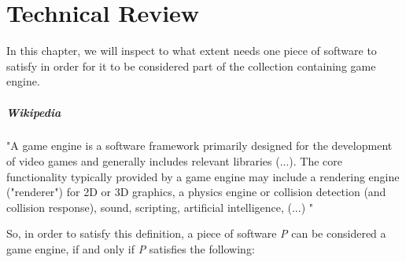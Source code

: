 \chapter{Technical Review}
    In this chapter, we will inspect to what extent needs one piece of software to satisfy in order for it to be considered part of the collection containing game engine.
    
    \paragraph*{Wikipedia} "A game engine is a software framework primarily designed for the development of video games and generally includes relevant libraries
    (...).
    The core functionality typically provided by a game engine may include a rendering engine ("renderer") for 2D or 3D graphics, a physics engine or collision detection (and collision response), sound, scripting, artificial intelligence, 
    (...)
    "

    So, in order to satisfy this definition, a piece of software \emph{P} can be considered a game engine, if and only if \emph{P} satisfies the following:

